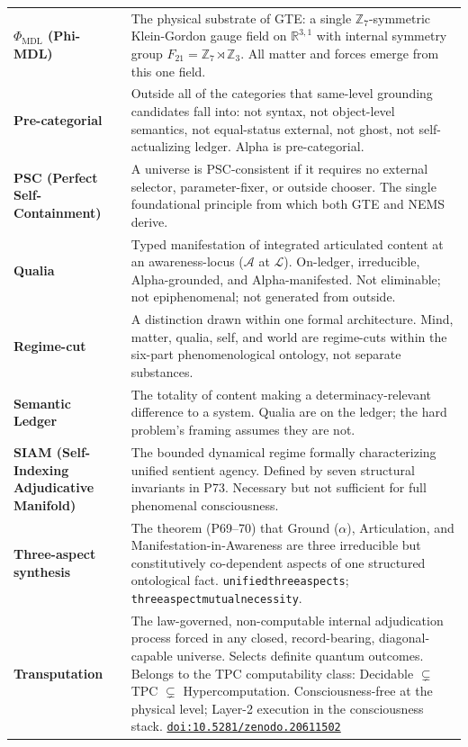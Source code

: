 \documentclass[11pt]{article}
\theoremstyle{remark}
\newcommand{\PHIMDL}{\Phi_{\mathrm{MDL}}}
\newcommand{\lean}[1]{%
  \penalty-100
  \begingroup\def\_{\textunderscore\allowbreak}\texttt{#1}\endgroup}
\newcommand{\OntL}{\mathcal{L}}
\newcommand{\OntA}{\mathcal{A}}
\newcommand{\doi}[1]{\href{https://doi.org/#1}{\nolinkurl{doi:#1}}}
\begin{document}
\begin{longtable}{@{}>{\bfseries}p{}p{}@{}}
$\PHIMDL$ (Phi-MDL) &
  The physical substrate of GTE: a single $\mathbb{Z}_7$-symmetric Klein-Gordon
  gauge field on $\mathbb{R}^{3,1}$ with internal symmetry group
  $F_{21} = \mathbb{Z}_7 \rtimes \mathbb{Z}_3$. All matter and forces emerge from
  this one field. \\[4pt]

Pre-categorial &
  Outside all of the categories that same-level grounding candidates fall into:
  not syntax, not object-level semantics, not equal-status external, not ghost,
  not self-actualizing ledger. Alpha is pre-categorial. \\[4pt]

PSC (Perfect Self-Containment) &
  A universe is PSC-consistent if it requires no external selector, parameter-fixer,
  or outside chooser. The single foundational principle from which both GTE and NEMS
  derive. \\[4pt]

Qualia &
  Typed manifestation of integrated articulated content at an awareness-locus ($\OntA$
  at $\OntL$). On-ledger, irreducible, Alpha-grounded, and Alpha-manifested.
  Not eliminable; not epiphenomenal; not generated from outside. \\[4pt]

Regime-cut &
  A distinction drawn within one formal architecture. Mind, matter, qualia, self, and
  world are regime-cuts within the six-part phenomenological ontology, not separate
  substances. \\[4pt]

Semantic Ledger &
  The totality of content making a determinacy-relevant difference to a system.
  Qualia are on the ledger; the hard problem's framing assumes they are not. \\[4pt]

SIAM (Self-Indexing Adjudicative Manifold) &
  The bounded dynamical regime formally characterizing unified sentient agency.
  Defined by seven structural invariants in P73. Necessary but not sufficient for
  full phenomenal consciousness. \\[4pt]

Three-aspect synthesis &
  The theorem (P69--70) that Ground ($\alpha$), Articulation, and
  Manifestation-in-Awareness are three irreducible but constitutively co-dependent
  aspects of one structured ontological fact.
  \lean{unified\_three\_aspects}; \lean{three\_aspect\_mutual\_necessity}. \\[4pt]

Transputation &
  The law-governed, non-computable internal adjudication process forced in any closed,
  record-bearing, diagonal-capable universe. Selects definite quantum outcomes.
  Belongs to the TPC computability class: Decidable $\subsetneq$ TPC $\subsetneq$
  Hypercomputation. Consciousness-free at the physical level; Layer-2 execution in
  the consciousness stack. \doi{10.5281/zenodo.20611502} \\[4pt]


\end{longtable}
\end{document}

